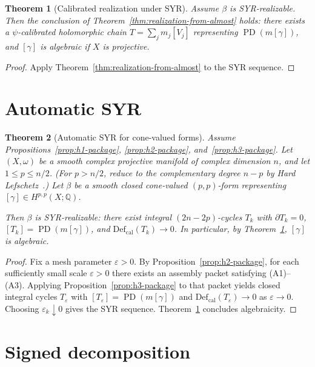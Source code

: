 \documentclass[11pt]{article}
\numberwithin{equation}{section}
\theoremstyle{plain}
\newtheorem{theorem}{Theorem}[section]
\theoremstyle{definition}
\theoremstyle{remark}
\DeclareMathOperator{\PD}{PD}
\newcommand{\Q}{\mathbb{Q}}
\newcommand{\eps}{\varepsilon}
\newcommand{\Def}{\mathrm{Def}}
\newcommand{\Defcal}{\Def_{\mathrm{cal}}}
\begin{document}
\begin{theorem}[Calibrated realization under SYR]\label{thm:syr}
Assume $\beta$ is SYR-realizable.  Then the conclusion of
Theorem~\ref{thm:realization-from-almost} holds: there exists a
$\psi$-calibrated holomorphic chain $T=\sum_j m_j[V_j]$ representing
$\PD(m[\gamma])$, and $[\gamma]$ is algebraic if $X$ is projective.
\end{theorem}

\begin{proof}
Apply Theorem~\ref{thm:realization-from-almost} to the SYR sequence.
\end{proof}


\section{Automatic SYR}\label{sec:syr}

\begin{theorem}[Automatic SYR for cone-valued forms]\label{thm:automatic-syr}
Assume Propositions~\ref{prop:h1-package}, \ref{prop:h2-package}, and~\ref{prop:h3-package}.
Let $(X,\omega)$ be a smooth complex projective manifold of complex
dimension $n$, and let $1\le p\le n/2$.  (For $p>n/2$, reduce to the
complementary degree $n-p$ by Hard Lefschetz~\cite{Voisin02,GH78}.)
Let $\beta$ be a smooth closed cone-valued $(p,p)$-form representing
$[\gamma]\in H^{p,p}(X;\Q)$.

Then $\beta$ is SYR-realizable: there exist integral $(2n{-}2p)$-cycles
$T_k$ with $\partial T_k=0$,
$[T_k]=\PD(m[\gamma])$, and $\Defcal(T_k)\to 0$.
In particular, by Theorem~\ref{thm:syr}, $[\gamma]$ is algebraic.
\end{theorem}

\begin{proof}
Fix a mesh parameter $\eps>0$.
By Proposition~\ref{prop:h2-package}, for each sufficiently small scale
$\eps>0$ there exists an assembly packet satisfying \textnormal{(A1)}--\textnormal{(A3)}.
Applying Proposition~\ref{prop:h3-package} to that packet yields closed
integral cycles $T_\eps$ with $[T_\eps]=\PD(m[\gamma])$ and
$\Defcal(T_\eps)\to 0$ as $\eps\to 0$.
Choosing $\eps_k\downarrow 0$ gives the SYR sequence.
Theorem~\ref{thm:syr} concludes algebraicity.
\end{proof}


\section{Signed decomposition}\label{sec:signed}
\end{document}
